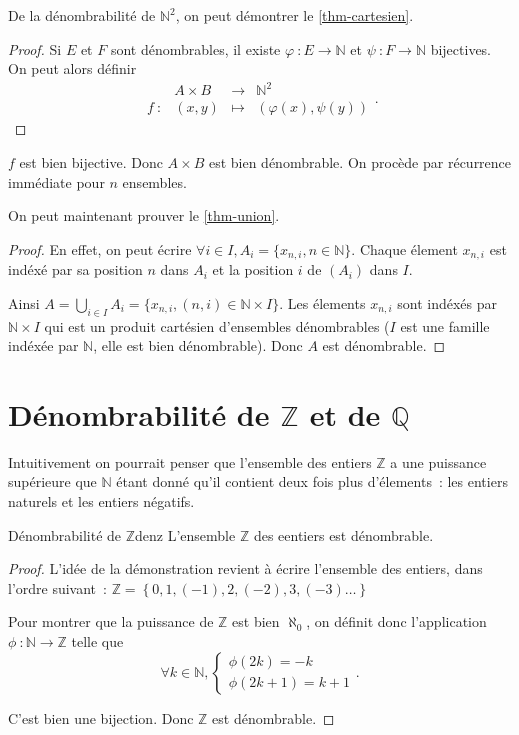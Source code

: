 \documentclass[a4paper,french,final]{memoir}
\begin{document}
De la dénombrabilité de $\mathbb{N}^2$, on peut démontrer le \cref{thm-cartesien}. 

\begin{proof}
	Si $E$ et $F$ sont dénombrables, il existe $\varphi~: E \to \mathbb{N}$ et $\psi~: F \to \mathbb{N}$ bijectives. On peut alors définir \[ \begin{array}{cccc}
	\ & A \times B & \to & \mathbb{N}^2 \\
	f~: & (x,y) & \mapsto & (\varphi(x), \psi(y))
	\end{array}.\]
	
\end{proof}

$f $ est bien bijective. Donc $A \times B$ est bien dénombrable. On procède par récurrence immédiate pour $n$ ensembles. 

On peut maintenant prouver le \cref{thm-union}. 


\begin{proof}
	En effet, on peut écrire $\forall i \in I, A_i = \{x_{n,i}, n \in \mathbb{N}\}$. Chaque élement $x_{n, i}$ est indéxé par sa position $n$ dans $A_i$ et la position $i$ de $(A_i)$ dans $I$. 
	
	Ainsi $A = \bigcup_{i \in I} A_i = \{x_{n, i}, (n,i) \in \mathbb{N} \times I\}$. Les élements $x_{n,i}$ sont indéxés par $\mathbb{N} \times I$ qui est un produit cartésien d'ensembles dénombrables ($I$ est une famille indéxée par $\mathbb{N}$, elle est bien dénombrable). Donc $A$ est dénombrable.
\end{proof}


\section{\texorpdfstring{Dénombrabilité de $\mathbb{Z}$ et de $\mathbb{Q}$}{}}

Intuitivement on pourrait penser que l'ensemble des entiers $\mathbb{Z}$ a une puissance supérieure que $\mathbb{N}$ étant donné qu'il contient deux fois plus d'élements~: les entiers naturels et les entiers négatifs. 

\begin{theoremb}{Dénombrabilité de $\mathbb{Z}$}{denz}
	L'ensemble $\mathbb{Z}$ des eentiers est dénombrable. 
\end{theoremb}

\begin{proof}
L'idée de la démonstration revient à écrire l'ensemble des entiers, dans l'ordre suivant~:  $\mathbb{Z}=\left\lbrace 0,1,(-1),2,(-2),3,(-3) \dots\right\rbrace$ 

	Pour montrer que la puissance de $\mathbb{Z}$ est bien $\aleph_0$, on définit donc l'application $\phi~: \mathbb{N} \to \mathbb{Z}$ telle que \[ \forall k \in \mathbb{N}, \left\lbrace \begin{array}{c}
	\phi(2k) = -k \\
	\phi(2k + 1) = k+1
	\end{array} \right. .\]
	
	C'est bien une bijection. Donc $\mathbb{Z}$ est dénombrable. 
\end{proof}
\end{document}
